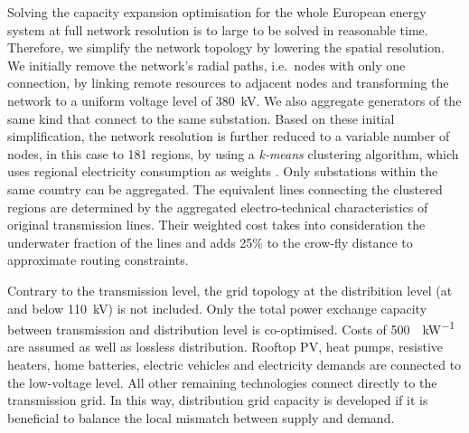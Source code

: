 
Solving the capacity expansion optimisation for the whole European energy system
at full network resolution is to large to be solved in reasonable time.
Therefore, we simplify the network topology by lowering the spatial resolution.
We initially remove the network's radial paths, i.e.~nodes with only one
connection, by linking remote resources to adjacent nodes and transforming the
network to a uniform voltage level of \SI{380}{\kilo\volt}. We also aggregate
generators of the same kind that connect to the same substation. Based on these
initial simplification, the network resolution is further reduced to a variable
number of nodes, in this case to 181 regions, by using a \textit{k-means}
clustering algorithm, which uses regional electricity consumption as weights
. Only substations within the
same country can be aggregated. The equivalent lines connecting the clustered
regions are determined by the aggregated electro-technical characteristics of
original transmission lines. Their weighted cost takes into consideration the
underwater fraction of the lines and adds 25\% to the crow-fly distance to
approximate routing constraints.


Contrary to the transmission level, the grid topology at the distribition level
(at and below \SI{110}{\kilo\volt}) is not included. Only the total power
exchange capacity between transmission and distribution level is co-optimised.
Costs of \SI{500}{\sieuro\per\kilo\watt} are assumed as well as lossless
distribution. Rooftop PV, heat pumps, resistive heaters, home batteries,
electric vehicles and electricity demands are connected to the low-voltage
level. All other remaining technologies connect directly to the transmission
grid. In this way, distribution grid capacity is developed if it is beneficial
to balance the local mismatch between supply and demand.